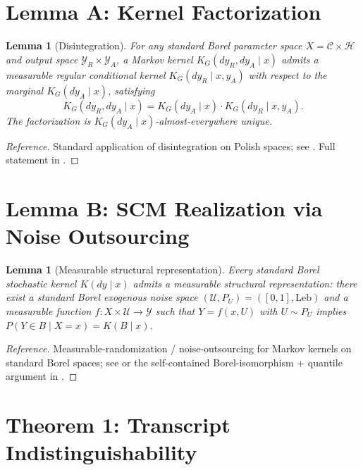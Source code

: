 \documentclass{article}
\theoremstyle{plain}
\newtheorem{lemma}[theorem]{Lemma}
\theoremstyle{definition}
\theoremstyle{remark}
\newcommand{\C}{\mathcal{C}}
\newcommand{\Y}{\mathcal{Y}}
\newcommand{\YR}{\mathcal{Y}_R}
\newcommand{\YA}{\mathcal{Y}_A}
\newcommand{\Hist}{\mathcal{H}}
\begin{document}
\section{Lemma A: Kernel Factorization}\label{sec:lem-A}

\begin{lemma}[Disintegration]\label{lem:A}
For any standard Borel parameter space $X = \C \times \Hist$ and output space
$\YR \times \YA$, a Markov kernel $K_G(dy_R, dy_A \mid x)$ admits a measurable
regular conditional kernel $K_G(dy_R \mid x, y_A)$ with respect to the marginal
$K_G(dy_A \mid x)$, satisfying
\[
K_G(dy_R, dy_A \mid x) = K_G(dy_A \mid x) \cdot K_G(dy_R \mid x, y_A).
\]
The factorization is $K_G(dy_A \mid x)$-almost-everywhere unique.
\end{lemma}
\begin{proof}[Reference]
Standard application of disintegration on Polish spaces; see
\citet[Theorem~8.5]{kallenberg2021}. Full statement in
.
\end{proof}

\section{Lemma B: SCM Realization via Noise Outsourcing}\label{sec:lem-B}

\begin{lemma}[Measurable structural representation]\label{lem:B}
Every standard Borel stochastic kernel $K(dy \mid x)$ admits a measurable
structural representation: there exist a standard Borel exogenous noise space
$(\mathcal{U}, P_U) = ([0,1], \mathrm{Leb})$ and a measurable function
$f : X \times \mathcal{U} \to \Y$ such that $Y = f(x, U)$ with $U \sim P_U$
implies $P(Y \in B \mid X = x) = K(B \mid x)$.
\end{lemma}
\begin{proof}[Reference]
Measurable-randomization / noise-outsourcing for Markov kernels on standard
Borel spaces; see \citet[Theorem~6.10 and Lemma~4.22]{kallenberg2021} or the
self-contained Borel-isomorphism + quantile argument in .
\end{proof}

\section{Theorem 1: Transcript Indistinguishability}\label{sec:thm-1}
\end{document}

